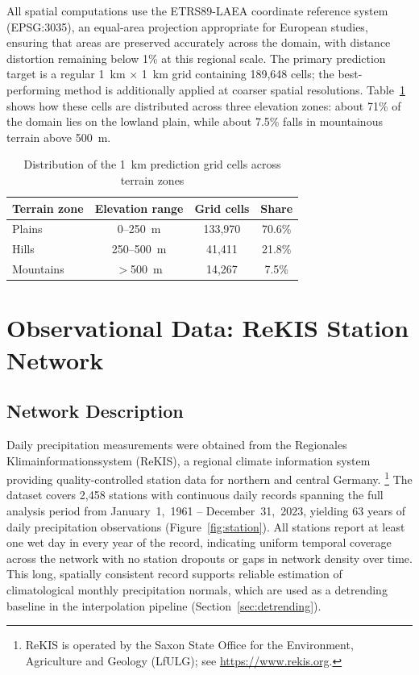 All spatial computations use the ETRS89-LAEA coordinate reference system
(EPSG:3035), an equal-area projection appropriate for European studies, ensuring
that areas are preserved accurately across the domain, with distance
distortion remaining below 1\% at this regional scale.
The primary prediction target is a regular 1~km $\times$ 1~km grid
containing 189{,}648 cells; the best-performing method is additionally
applied at coarser spatial resolutions.
Table~\ref{tab:terrain-zones} shows how these cells are distributed across
three elevation zones: about 71\% of the domain lies on the lowland plain,
while about 7.5\% falls in mountainous terrain above 500~m.

\begin{table}[ht]
  \centering
  \caption{Distribution of the 1~km prediction grid cells across terrain zones}
  \label{tab:terrain-zones}
  \begin{tabular}{lccc}
    \toprule
    Terrain zone & Elevation range & Grid cells & Share \\
    \midrule
    Plains    & 0--250~m   & 133{,}970 & 70.6\% \\
    Hills     & 250--500~m &  41{,}411 & 21.8\% \\
    Mountains & $>$500~m   &  14{,}267 &  7.5\% \\
    \bottomrule
  \end{tabular}
\end{table}

\section{Observational Data: ReKIS Station Network}

\subsection{Network Description}

Daily precipitation measurements were obtained from the Regionales
Klimainformationssystem (ReKIS), a regional climate information system
providing quality-controlled station data for northern and central Germany.%
\footnote{ReKIS is operated by the Saxon State Office for the
Environment, Agriculture and Geology (LfULG); see
\url{https://www.rekis.org}.}
The dataset covers 2{,}458 stations with continuous daily records spanning the
full analysis period from January~1,~1961 -- December~31,~2023, yielding
63 years of daily precipitation observations (Figure~\ref{fig:station}).
All stations report at least one wet day in every year of the record, indicating
uniform temporal coverage across the network with no station dropouts or
gaps in network density over time.
This long, spatially consistent record supports reliable estimation of
climatological monthly precipitation normals, which are used as a detrending
baseline in the interpolation pipeline (Section~\ref{sec:detrending}).

